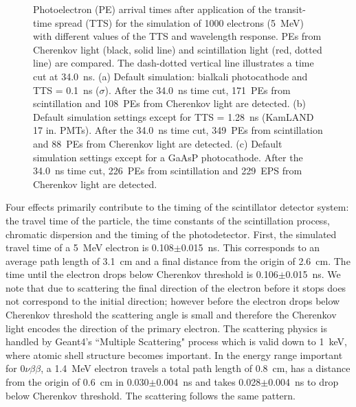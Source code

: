 \documentclass[cits]{JINST}
\begin{document}
\begin{figure}[tbh]
\begin{center}
        \caption[]{Photoelectron (PE) arrival times after application
        of the transit-time spread (TTS) for the simulation
        of 1000 electrons (5~MeV) with different values of the TTS and
        wavelength response. PEs from
        Cherenkov light (black, solid line) and scintillation light
        (red, dotted line) are
        compared. The dash-dotted vertical line illustrates a time cut at
        34.0~ns. (a) Default simulation: bialkali photocathode and TTS =
        0.1~ns ($\sigma$). After the 34.0~ns time cut, 171~PEs
        from scintillation and 108~PEs from Cherenkov light are detected. (b)
        Default simulation settings except for TTS = 1.28~ns (KamLAND
        17 in. PMTs). After the 34.0~ns time cut, 349~PEs from
        scintillation and 88~PEs from Cherenkov light are detected. (c) Default
        simulation settings except for a GaAsP photocathode. After the
        34.0~ns time cut, 226~PEs from scintillation and 229~EPS
        from Cherenkov light are detected. \label{time_plots_comparison}}
        \end{center}
\end{figure}


Four effects primarily contribute to the timing of the scintillator detector
system: the travel time of the particle, the time constants of the scintillation process, chromatic dispersion and the timing of the photodetector.  First, the simulated travel time of a 5~MeV electron is 0.108$\pm$0.015~ns. This corresponds to an average path length of 3.1~cm and a final distance from the origin of 2.6~cm. The time until the electron drops below Cherenkov threshold is 0.106$\pm$0.015~ns. We note that due to scattering the final direction of the electron before it stops does not correspond to the initial direction; however before the electron drops below Cherenkov threshold the scattering angle is small and therefore the Cherenkov light encodes the direction of the primary electron. The scattering physics is handled by Geant4's ``Multiple Scattering" process which is valid down to 1~keV, where atomic shell structure becomes important\cite{geant4scatt}. In the energy range important for $0\nu\beta\beta$, a 1.4~MeV electron travels a total path length of 0.8~cm, has a distance from the origin of 0.6~cm in 0.030$\pm$0.004~ns  and takes 0.028$\pm$0.004~ns to drop below Cherenkov threshold. The scattering follows the same pattern. 
\end{document}
